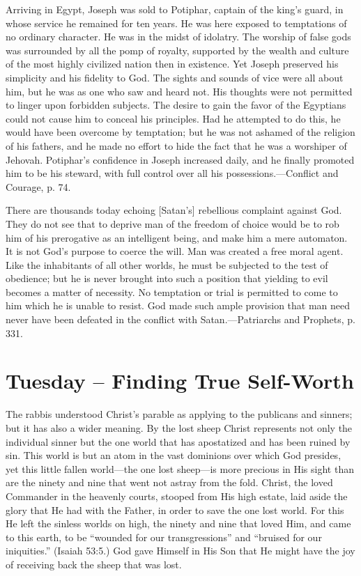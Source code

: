 \documentclass[a4paper, 10pt, twoside, headings=small]{scrartcl}
\begin{document}
\begin{multicols}{2}
Arriving in Egypt, Joseph was sold to Potiphar, captain of the king’s guard, in whose service he remained for ten years. He was here exposed to temptations of no ordinary character. He was in the midst of idolatry. The worship of false gods was surrounded by all the pomp of royalty, supported by the wealth and culture of the most highly civilized nation then in existence. Yet Joseph preserved his simplicity and his fidelity to God. The sights and sounds of vice were all about him, but he was as one who saw and heard not. His thoughts were not permitted to linger upon forbidden subjects. The desire to gain the favor of the Egyptians could not cause him to conceal his principles. Had he attempted to do this, he would have been overcome by temptation; but he was not ashamed of the religion of his fathers, and he made no effort to hide the fact that he was a worshiper of Jehovah. Potiphar’s confidence in Joseph increased daily, and he finally promoted him to be his steward, with full control over all his possessions.—Conflict and Courage, p. 74.

There are thousands today echoing [Satan’s] rebellious complaint against God. They do not see that to deprive man of the freedom of choice would be to rob him of his prerogative as an intelligent being, and make him a mere automaton. It is not God’s purpose to coerce the will. Man was created a free moral agent. Like the inhabitants of all other worlds, he must be subjected to the test of obedience; but he is never brought into such a position that yielding to evil becomes a matter of necessity. No temptation or trial is permitted to come to him which he is unable to resist. God made such ample provision that man need never have been defeated in the conflict with Satan.—Patriarchs and Prophets, p. 331.

\section*{Tuesday – Finding True Self-Worth}

The rabbis understood Christ’s parable as applying to the publicans and sinners; but it has also a wider meaning. By the lost sheep Christ represents not only the individual sinner but the one world that has apostatized and has been ruined by sin. This world is but an atom in the vast dominions over which God presides, yet this little fallen world—the one lost sheep—is more precious in His sight than are the ninety and nine that went not astray from the fold. Christ, the loved Commander in the heavenly courts, stooped from His high estate, laid aside the glory that He had with the Father, in order to save the one lost world. For this He left the sinless worlds on high, the ninety and nine that loved Him, and came to this earth, to be “wounded for our transgressions” and “bruised for our iniquities.” (Isaiah 53:5.) God gave Himself in His Son that He might have the joy of receiving back the sheep that was lost.


\end{multicols}
\end{document}
